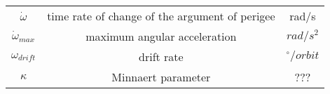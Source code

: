 \begin{center}
\begin{longtable}{c|c|c}
$\dot \omega$ 											& time rate of change of the argument of perigee 													& rad/s\\

$\dot \omega_{max}$                 & maximum angular acceleration                														& $rad/s^2$ \\ 

$\omega_{drift}$                    & drift rate                                  														& $^\circ/orbit$ \\

$\kappa$                            & Minnaert parameter                  																		& ??? \\
 
\end{longtable}
\end{center}